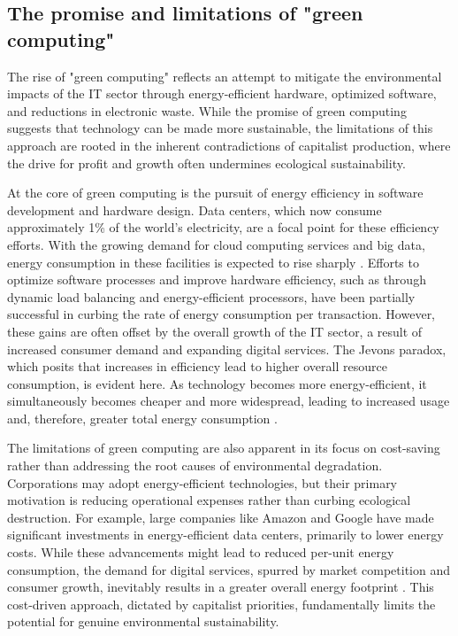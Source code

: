 \subsection{The promise and limitations of "green computing"}

The rise of "green computing" reflects an attempt to mitigate the environmental impacts of the IT sector through energy-efficient hardware, optimized software, and reductions in electronic waste. While the promise of green computing suggests that technology can be made more sustainable, the limitations of this approach are rooted in the inherent contradictions of capitalist production, where the drive for profit and growth often undermines ecological sustainability.

At the core of green computing is the pursuit of energy efficiency in software development and hardware design. Data centers, which now consume approximately 1\% of the world’s electricity, are a focal point for these efficiency efforts. With the growing demand for cloud computing services and big data, energy consumption in these facilities is expected to rise sharply \cite[pp.~90-92]{masanet2020recalibrating}. Efforts to optimize software processes and improve hardware efficiency, such as through dynamic load balancing and energy-efficient processors, have been partially successful in curbing the rate of energy consumption per transaction. However, these gains are often offset by the overall growth of the IT sector, a result of increased consumer demand and expanding digital services. The Jevons paradox, which posits that increases in efficiency lead to higher overall resource consumption, is evident here. As technology becomes more energy-efficient, it simultaneously becomes cheaper and more widespread, leading to increased usage and, therefore, greater total energy consumption \cite[pp.~15-17]{polimeni2008jevons}.

The limitations of green computing are also apparent in its focus on cost-saving rather than addressing the root causes of environmental degradation. Corporations may adopt energy-efficient technologies, but their primary motivation is reducing operational expenses rather than curbing ecological destruction. For example, large companies like Amazon and Google have made significant investments in energy-efficient data centers, primarily to lower energy costs. While these advancements might lead to reduced per-unit energy consumption, the demand for digital services, spurred by market competition and consumer growth, inevitably results in a greater overall energy footprint \cite[pp.~210-212]{koomey2011growth}. This cost-driven approach, dictated by capitalist priorities, fundamentally limits the potential for genuine environmental sustainability.

